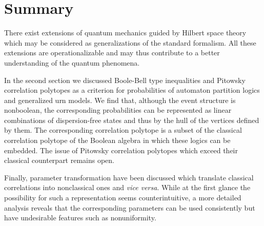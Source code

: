 \section{Summary}

There exist extensions of quantum mechanics
guided by Hilbert space theory
which may be considered
as generalizations of the standard formalism.
All these extensions are operationalizable and may thus contribute
to a better understanding of the quantum phenomena.

In the second section we discussed Boole-Bell type inequalities
and Pitowsky correlation polytopes as a criterion for probabilities
of automaton partition logics and generalized urn models.
We find that, although the event structure is nonboolean,
the corresponding probabilities can be represented as linear combinations of
dispersion-free states and thus by the hull of the vertices defined by them.
The corresponding correlation polytope is a subset of the classical correlation
polytope of the Boolean algebra in which these logics can be embedded.
The issue of Pitowsky correlation polytopes which exceed their classical
counterpart remains open.

Finally, parameter transformation have been discussed which translate classical
correlations into nonclassical ones and {\it vice versa}.
While at the first glance the possibility for such a representation seems counterintuitive,
a more detailed analysis reveals that the corresponding parameters
can be used consistently but have undesirable
features such as nonuniformity.

%
%
%

